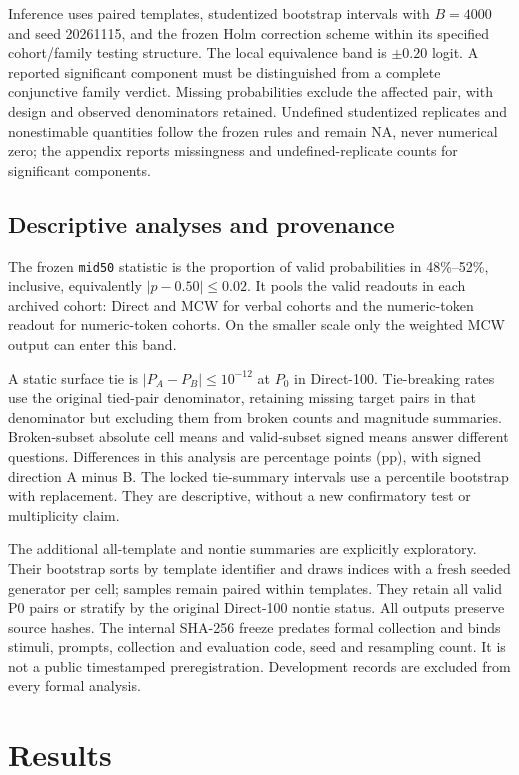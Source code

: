 \documentclass[11pt]{article}
\begin{document}
Inference uses paired templates, studentized bootstrap intervals with $B=4000$ and seed 20261115, and the frozen Holm correction scheme within its specified cohort/family testing structure. The local equivalence band is $\pm0.20$ logit. A reported significant component must be distinguished from a complete conjunctive family verdict. Missing probabilities exclude the affected pair, with design and observed denominators retained. Undefined studentized replicates and nonestimable quantities follow the frozen rules and remain NA, never numerical zero; the appendix reports missingness and undefined-replicate counts for significant components.

\subsection{Descriptive analyses and provenance}
The frozen \texttt{mid50} statistic is the proportion of valid probabilities in 48\%--52\%, inclusive, equivalently $|p-0.50|\le0.02$. It pools the valid readouts in each archived cohort: Direct and MCW for verbal cohorts and the numeric-token readout for numeric-token cohorts. On the smaller scale only the weighted MCW output can enter this band.

A static surface tie is $|P_A-P_B|\le10^{-12}$ at $P_0$ in Direct-100. Tie-breaking rates use the original tied-pair denominator, retaining missing target pairs in that denominator but excluding them from broken counts and magnitude summaries. Broken-subset absolute cell means and valid-subset signed means answer different questions. Differences in this analysis are percentage points (pp), with signed direction A minus B. The locked tie-summary intervals use a percentile bootstrap with replacement. They are descriptive, without a new confirmatory test or multiplicity claim.

The additional all-template and nontie summaries are explicitly exploratory. Their bootstrap sorts by template identifier and draws indices with a fresh seeded generator per cell; samples remain paired within templates. They retain all valid P0 pairs or stratify by the original Direct-100 nontie status. All outputs preserve source hashes. The internal SHA-256 freeze predates formal collection and binds stimuli, prompts, collection and evaluation code, seed and resampling count. It is not a public timestamped preregistration. Development records are excluded from every formal analysis.

\section{Results}
\end{document}
